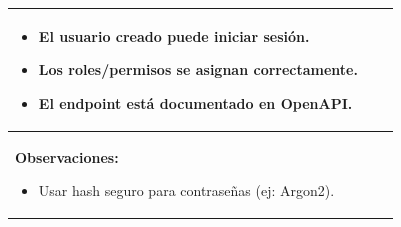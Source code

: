 \begin{table}[H]
\begin{center}
\begin{tabularx}{\textwidth}{|l|X|l|}
{\begin{itemize}
                        \item El usuario creado puede iniciar sesión.
                        \item Los roles/permisos se asignan correctamente.
                        \item El endpoint está documentado en OpenAPI.
                    \end{itemize}
            }\\
            \hline
            \multicolumn{3}{|p{\textwidth}|}{
                \textbf{Observaciones:}
                \begin{itemize}
                    \item Usar hash seguro para contraseñas (ej: Argon2).
                \end{itemize}
            }\\
            \hline
        \end{tabularx}
    \end{center}
\end{table}

